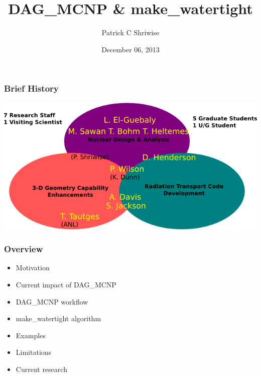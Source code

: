 \documentclass[14pt]{beamer}
\begin{document}
\title{DAG\_MCNP \& make\_watertight}
\author{Patrick C Shriwise}
\date{ December 06, 2013}

\maketitle


\begin{frame}
\frametitle{Brief History}

\includegraphics[scale=0.65, trim = 0 0 20 0]{UWNeutronicsVenn.png}
\end{frame}

\begin{frame}
\frametitle{Overview}

\begin{itemize}

\item Motivation
\item Current impact of DAG\_MCNP
\item DAG\_MCNP workflow
\item make\_watertight algorithm
\item Examples
\item Limitations
\item Current research

\end{itemize}
\end{frame}
\end{document}
